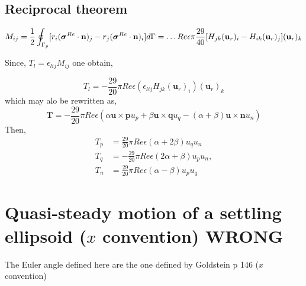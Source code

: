 \documentclass[12pt]{My_preprint}
\begin{document}
\subsection{Reciprocal theorem}
\begin{align}
  M_{ij}=
  \frac{1}{2}\intS[p]{[ r_i (\bm\sigma^{Re}\cdot \textbf{n})_j- r_j (\bm\sigma^{Re}\cdot \textbf{n})_i]}
  =
  \ldots
    Re \epsilon \pi
  \frac{29}{40}[H_{jk}(\textbf{u}_r)_i - H_{ik}(\textbf{u}_r)_j ] (\textbf{u}_r)_k
  \label{eq:first_mom}
\end{align}

Since, $T _ l  = \epsilon _{lij}   M_{ij}$ one obtain,

\begin{equation}
  T _ l = - \frac{29 }{20} \pi Re \epsilon  (\epsilon _{lij}H_{jk}(\textbf{u}_r)_i)(\textbf{u}_r)_k
\end{equation}
which may alo be rewritten as,
\begin{equation}
  \bm T  = - \frac{29 }{20} \pi Re \epsilon  (\alpha \bm u \times \bm p u_p +\beta\bm u \times \bm q u_q-(\alpha+\beta)\bm u \times \bm n u_n )
\end{equation}
Then,
\begin{align}
  T_p  &=  \frac{29 }{20} \pi Re \epsilon  (\alpha +2\beta) u_q u_n \\
  T_q  &=  -\frac{29 }{20} \pi Re \epsilon  (2\alpha +\beta) u_p u_n,\\
  T_n  &=  \frac{29 }{20} \pi Re \epsilon  (\alpha -\beta) u_p u_q
\end{align}





\section{Quasi-steady motion of a settling ellipsoid ($x$ convention) WRONG}
The Euler angle defined here are the one defined by Goldstein p 146 ($x$ convention)
\end{document}
